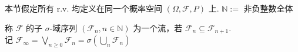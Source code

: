 \documentclass[lang=cn,10pt,thmcnt=section]{elegantbook}
\begin{document}
本节假定所有 r.v. 均定义在同一个概率空间 $(\Omega, \mathcal{F}, P)$ 上. 
$\mathbb{N} :=$ 非负整数全体

\begin{definition}
	称 $\mathcal{F}$ 的子 $\sigma$-域序列 $(\mathcal{F}_n, n \in \mathbb{N})$ 为一个流，若 $\mathcal{F}_n \subseteq \mathcal{F}_{n+1}$. \\
记 $\mathcal{F}_\infty = \bigvee_{n \geq 0} \mathcal{F}_n = \sigma(\bigcup_n \mathcal{F}_n)$
\end{definition}
\end{document}
